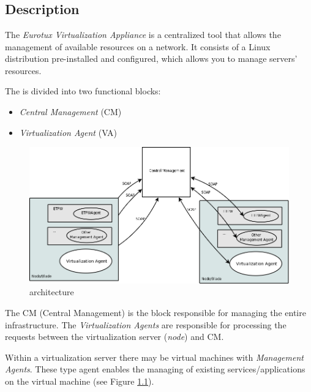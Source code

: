 \chapter{\textsf{\acronym}}
\section*{Description}
The \emph{Eurotux Virtualization Appliance} is a centralized tool that allows the management of available resources on a network. It consists of a Linux distribution pre-installed and configured, which allows you to manage servers' resources.

The \acronym is divided into two functional blocks:

\begin{itemize}
	\item \emph{Central Management} (CM)
    \item \emph{Virtualization Agent} (VA)
\end{itemize}

\begin{figure}[H]
	\begin{center}
	\includegraphics[scale=0.35]{screenshots/etva_blocos.png}
	\caption{\acronym architecture}
	\label{fig:etva_blocos}
	\end{center}
\end{figure}

The CM (Central Management) is the block responsible for managing the entire infrastructure.
The \emph{Virtualization Agents} are responsible for processing the requests between the virtualization server (\emph{node}) and CM.

Within a virtualization server there may be virtual machines with \emph{Management Agents}. These type agent enables the managing of existing services/applications on the virtual machine (see Figure \ref{fig:etva_blocos}).


